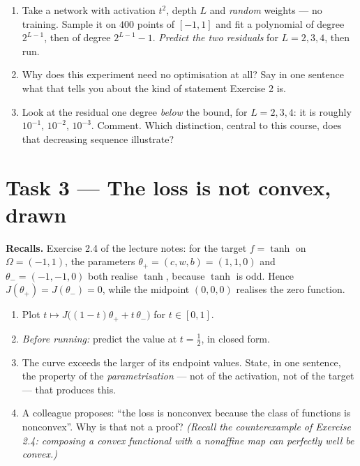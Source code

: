 \documentclass[11pt,a4paper]{article}
\begin{document}
\begin{task}\label{task:poly} \tagcore
\leavevmode
\begin{enumerate}[label=\textbf{\arabic*.}]
\item Take a network with activation $t^2$, depth $L$ and \emph{random} weights --- no training.
Sample it on $400$ points of $[-1,1]$ and fit a polynomial of degree $2^{L-1}$, then of degree
$2^{L-1}-1$. \emph{Predict the two residuals} for $L=2,3,4$, then run.
\item Why does this experiment need no optimisation at all? Say in one sentence what that tells you
about the kind of statement Exercise 2 is.
\item Look at the residual one degree \emph{below} the bound, for $L=2,3,4$: it is roughly
$10^{-1}$, $10^{-2}$, $10^{-3}$. Comment. Which distinction, central to this course, does that
decreasing sequence illustrate?
\end{enumerate}
\end{task}

\section{Task 3 --- The loss is not convex, drawn}

\begin{plainbox}
\textbf{Recalls.} Exercise 2.4 of the lecture notes: for the target $f = \tanh$ on $\Omega=(-1,1)$,
the parameters $\theta_+ = (c,w,b) = (1,1,0)$ and $\theta_-=(-1,-1,0)$ both realise $\tanh$, because
$\tanh$ is odd. Hence $J(\theta_+) = J(\theta_-) = 0$, while the midpoint $(0,0,0)$ realises the
zero function.
\end{plainbox}

\begin{task}\label{task:nonconvex} \tagcore
\leavevmode
\begin{enumerate}[label=\textbf{\arabic*.}]
\item Plot $t \mapsto J\big((1-t)\theta_+ + t\,\theta_-\big)$ for $t \in [0,1]$.
\item \emph{Before running:} predict the value at $t = \tfrac12$, in closed form.
\item The curve exceeds the larger of its endpoint values. State, in one sentence, the property of
the \emph{parametrisation} --- not of the activation, not of the target --- that produces this.
\item A colleague proposes: ``the loss is nonconvex because the class of functions is nonconvex''.
Why is that not a proof? \emph{(Recall the counterexample of Exercise 2.4: composing a convex
functional with a nonaffine map can perfectly well be convex.)}
\end{enumerate}
\end{task}
\end{document}
